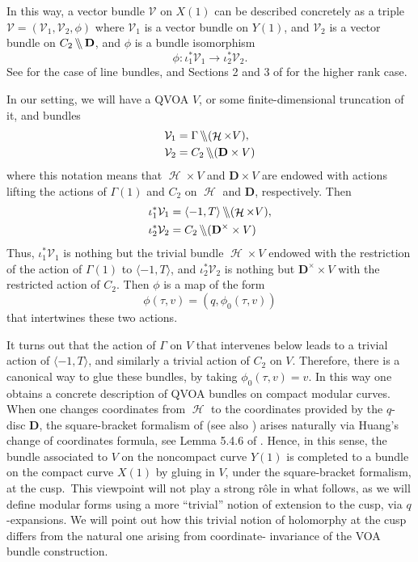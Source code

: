 \documentclass[12pt]{amsart}
\theoremstyle{plain}
\theoremstyle{definition}
\theoremstyle{remark}
\newcommand{\cV}{\mathcal{V}}
\newcommand{\bD}{\mathbf{D}}
\DeclareMathOperator{\uhp}{\mathcal{H}}
\DeclareMathOperator{\obackslash}{\backslash\hspace{-3pt}\backslash}
\begin{document}
\medskip
In this way, a vector bundle $\cV$ on $X(1)$ can be described concretely as a triple $\cV = (\cV_1,\cV_2,\phi)$ where $\cV_1$ is a vector bundle on $Y(1)$, and $\cV_2$ is a vector bundle on $C_2\obackslash \bD$, and $\phi$ is a bundle isomorphism
\[
\phi \colon \iota_1^*\cV_1 \to \iota_2^*\cV_2.
\]
See \cite{Hain} for the case of line bundles, and Sections 2 and 3 of \cite{CandeloriFranc} for the higher rank case.

In our setting, we will have a QVOA $V$, or some finite-dimensional truncation of it, and bundles
\begin{align*}
\cV_1 &= \Gamma \obackslash (\uhp \times V),\\
\cV_2 &= C_2 \obackslash (\bD \times V)
\end{align*}
where this notation means that $\uhp\times V$ and $\bD\times V$ are endowed with actions lifting the actions of $\Gamma(1)$ and $C_2$ on $\uhp$ and $\bD$, respectively. Then
\begin{align*}
    \iota_1^*\cV_1 &= \langle -1, T\rangle \obackslash (\uhp \times V),\\
    \iota_2^*\cV_2 &= C_2 \obackslash (\bD^\times\times V)
\end{align*}
Thus, $\iota_1^*\cV_1$ is nothing but the trivial bundle $\uhp\times V$ endowed with the restriction of the action of $\Gamma(1)$ to $\langle -1, T\rangle$, and $\iota_2^*\cV_2$ is nothing but $\bD^\times \times V$ with the restricted action of $C_2$. Then $\phi$ is a map of the form
\[
\phi(\tau,v) = (q,\phi_0(\tau,v))
\]
that intertwines these two actions.

\medskip
It turns out that the action of $\Gamma$ on $V$ that intervenes below leads to a trivial action of $\langle -1,T\rangle$, and similarly a trivial action of $C_2$ on $V$. Therefore, there is a canonical way to glue these bundles, by taking $\phi_0(\tau,v) = v$. In this way one obtains a concrete description of QVOA bundles on compact modular curves. When one changes coordinates from $\uhp$ to the coordinates provided by the $q$-disc 
$\bD$, the square-bracket formalism of \cite{Zhu} (see also \cite{DLMmodular, MT}) arises naturally via Huang's change of coordinates formula, see Lemma 5.4.6 of \cite{FBZ}. Hence, in this sense, the bundle associated to $V$ on the noncompact curve $Y(1)$ is completed to a bundle on the compact curve $X(1)$ by gluing in $V$, under the square-bracket formalism, at the cusp.\ This viewpoint will not play a strong r\^{o}le in what follows, as we will define modular forms using a more ``trivial'' notion of extension to the cusp, via $q$-expansions. We will point out how this trivial notion of holomorphy at the cusp differs from the natural one arising from coordinate- invariance of the VOA bundle construction.
\end{document}
